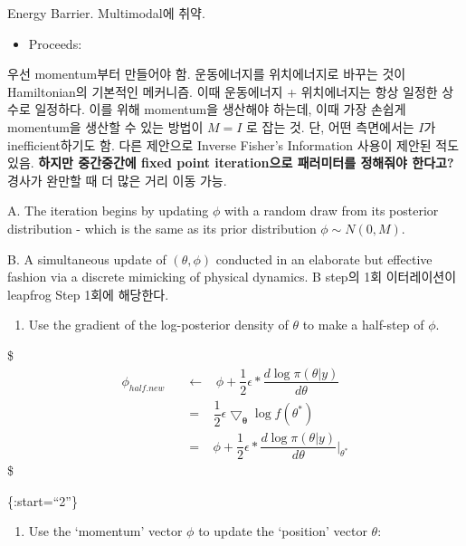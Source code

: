 \documentclass[
]{book}
\providecommand{\tightlist}{%
  \setlength{\itemsep}{0pt}\setlength{\parskip}{0pt}}
\begin{document}
Energy Barrier. Multimodal에 취약.

\begin{itemize}
\tightlist
\item
  Proceeds:
\end{itemize}

우선 momentum부터 만들어야 함. 운동에너지를 위치에너지로 바꾸는 것이 Hamiltonian의 기본적인 메커니즘. 이때 운동에너지 + 위치에너지는 항상 일정한 상수로 일정하다. 이를 위해 momentum을 생산해야 하는데, 이때 가장 손쉽게 momentum을 생산할 수 있는 방법이 \(M=I\) 로 잡는 것. 단, 어떤 측면에서는 \(I\)가 inefficient하기도 함. 다른 제안으로 Inverse Fisher's Information 사용이 제안된 적도 있음. \textbf{하지만 중간중간에 fixed point iteration으로 패러미터를 정해줘야 한다고?} 경사가 완만할 때 더 많은 거리 이동 가능.

A. The iteration begins by updating \(\phi\) with a random draw from its posterior distribution - which is the same as its prior distribution \(\phi \sim N(0, M)\).

B. A simultaneous update of \((\theta, \phi)\) conducted in an elaborate but effective fashion via a discrete mimicking of physical dynamics. B step의 1회 이터레이션이 leapfrog Step 1회에 해당한다.

\begin{enumerate}
\def\labelenumi{\arabic{enumi}.}
\tightlist
\item
  Use the gradient of the log-posterior density of \(\theta\) to make a half-step of \(\phi\).
\end{enumerate}

\$
\begin{align}

\phi_{half.new} \; \; \; &\leftarrow \; \; \; \phi + \dfrac {1}{2} \epsilon \ast \dfrac{d \log \pi(\theta \vert y)}{d \theta} \\

&= \; \; \; \dfrac{1}{2} \epsilon \bigtriangledown_{\pmb \theta} \log f(\theta^\ast) \\

&= \; \; \; \phi + \dfrac {1}{2} \epsilon \ast \dfrac{d \log \pi(\theta \vert y)}{d \theta} \Bigg \vert_{\theta^\ast}

\end{align}
\$

\{:start=``2''\}

\begin{enumerate}
\def\labelenumi{\arabic{enumi}.}
\setcounter{enumi}{1}
\tightlist
\item
  Use the `momentum' vector \(\phi\) to update the `position' vector \(\theta\):
\end{enumerate}
\end{document}
